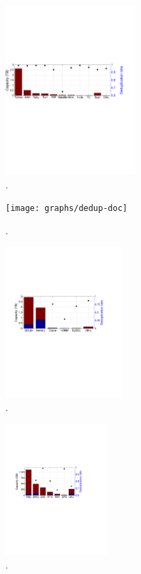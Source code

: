 \begin{figure}
	\centering
	\includegraphics[width=0.45\textwidth]{graphs/dedup-scrp}
	\caption{.
	}
	\label{fig:dedup-scrp}
\end{figure}

\begin{figure}
	\centering
	\texttt{[image: graphs/dedup-doc]}
	\caption{.
	}
	\label{fig:dedup-doc}
\end{figure}

\begin{figure}
	\centering
	\includegraphics[width=0.4\textwidth]{graphs/dedup-db}
	\caption{.
	}
	\label{fig:dedup-db}
\end{figure}

\begin{figure}
	\centering
	\includegraphics[width=0.35\textwidth]{graphs/dedup-img}
	\caption{.
	}
	\label{fig:dedup-img}
\end{figure}


